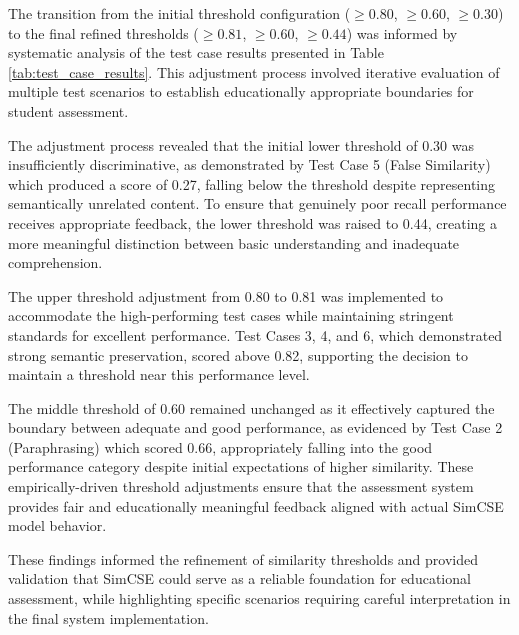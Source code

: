 {The transition from the initial threshold configuration ($\geq 0.80$, $\geq 0.60$, $\geq 0.30$) to the final refined thresholds ($\geq 0.81$, $\geq 0.60$, $\geq 0.44$) was informed by systematic analysis of the test case results presented in Table \ref{tab:test_case_results}. This adjustment process involved iterative evaluation of multiple test scenarios to establish educationally appropriate boundaries for student assessment.

The adjustment process revealed that the initial lower threshold of 0.30 was insufficiently discriminative, as demonstrated by Test Case 5 (False Similarity) which produced a score of 0.27, falling below the threshold despite representing semantically unrelated content. To ensure that genuinely poor recall performance receives appropriate feedback, the lower threshold was raised to 0.44, creating a more meaningful distinction between basic understanding and inadequate comprehension.

The upper threshold adjustment from 0.80 to 0.81 was implemented to accommodate the high-performing test cases while maintaining stringent standards for excellent performance. Test Cases 3, 4, and 6, which demonstrated strong semantic preservation, scored above 0.82, supporting the decision to maintain a threshold near this performance level.

The middle threshold of 0.60 remained unchanged as it effectively captured the boundary between adequate and good performance, as evidenced by Test Case 2 (Paraphrasing) which scored 0.66, appropriately falling into the good performance category despite initial expectations of higher similarity. These empirically-driven threshold adjustments ensure that the assessment system provides fair and educationally meaningful feedback aligned with actual SimCSE model behavior.


These findings informed the refinement of similarity thresholds and provided validation that SimCSE could serve as a reliable foundation for educational assessment, while highlighting specific scenarios requiring careful interpretation in the final system implementation.



}

